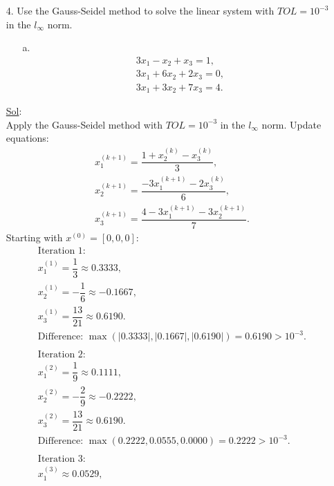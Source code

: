 \begin{enumerate}
  \item[4.] Use the Gauss-Seidel method to solve the linear system
    with \(TOL = 10^{-3}\) in the \(l_{\infty}\) norm.
    \begin{enumerate}
      \item[a.] \[
          \begin{array}{l}
            3x_1 - x_2 + x_3 = 1, \\
            3x_1 + 6x_2 + 2x_3 = 0, \\
            3x_1 + 3x_2 + 7x_3 = 4.
          \end{array}
        \]
    \end{enumerate}

    \underline{Sol}:\\
    Apply the Gauss-Seidel method with \(TOL = 10^{-3}\) in the
    \(l_\infty\) norm. Update equations:
    \[
      \begin{array}{l}
        x_1^{(k+1)} = \dfrac{1 + x_2^{(k)} - x_3^{(k)}}{3}, \\
        x_2^{(k+1)} = \dfrac{-3x_1^{(k+1)} - 2x_3^{(k)}}{6}, \\
        x_3^{(k+1)} = \dfrac{4 - 3x_1^{(k+1)} - 3x_2^{(k+1)}}{7}.
      \end{array}
    \]
    Starting with \(x^{(0)} = [0, 0, 0]\):
    \[
      \begin{array}{l}
        \text{Iteration 1:} \\
        x_1^{(1)} = \dfrac{1}{3} \approx 0.3333, \\
        x_2^{(1)} = -\dfrac{1}{6} \approx -0.1667, \\
        x_3^{(1)} = \dfrac{13}{21} \approx 0.6190. \\
        \text{Difference: } \max(|0.3333|, |0.1667|, |0.6190|) =
        0.6190 > 10^{-3}. \\
        \\
        \text{Iteration 2:} \\
        x_1^{(2)} = \dfrac{1}{9} \approx 0.1111, \\
        x_2^{(2)} = -\dfrac{2}{9} \approx -0.2222, \\
        x_3^{(2)} = \dfrac{13}{21} \approx 0.6190. \\
        \text{Difference: } \max(0.2222, 0.0555, 0.0000) = 0.2222 > 10^{-3}. \\
        \\
        \text{Iteration 3:} \\
        x_1^{(3)} \approx 0.0529, \\

\end{array}\]
\end{enumerate}
